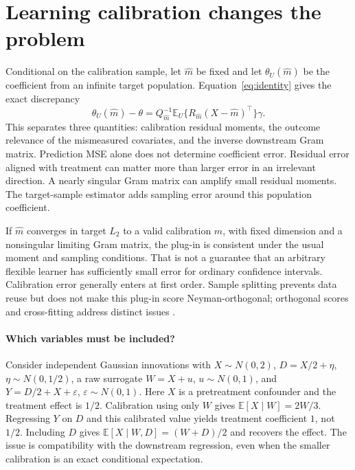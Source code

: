 \documentclass[11pt]{article}
\newcommand{\E}{\mathbb{E}}
\begin{document}
\section{Learning calibration changes the problem}
Conditional on the calibration sample, let $\widehat m$ be fixed and let $\theta_U(\widehat m)$ be the coefficient from an infinite target population. Equation~\eqref{eq:identity} gives the exact discrepancy
\begin{equation}\label{eq:drift}
\theta_U(\widehat m)-\theta
 =Q_{\widehat m}^{-1}\E_U\{R_{\widehat m}(X-\widehat m)^\top\}\gamma.
\end{equation}
This separates three quantities: calibration residual moments, the outcome relevance of the mismeasured covariates, and the inverse downstream Gram matrix. Prediction MSE alone does not determine coefficient error. Residual error aligned with treatment can matter more than larger error in an irrelevant direction. A nearly singular Gram matrix can amplify small residual moments. The target-sample estimator adds sampling error around this population coefficient.

If $\widehat m$ converges in target $L_2$ to a valid calibration $m$, with fixed dimension and a nonsingular limiting Gram matrix, the plug-in is consistent under the usual moment and sampling conditions. That is not a guarantee that an arbitrary flexible learner has sufficiently small error for ordinary confidence intervals. Calibration error generally enters at first order. Sample splitting prevents data reuse but does not make this plug-in score Neyman-orthogonal; orthogonal scores and cross-fitting address distinct issues \citep{chernozhukov2018}.

\paragraph{Which variables must be included?}
Consider independent Gaussian innovations with $X\sim N(0,2)$, $D=X/2+\eta$, $\eta\sim N(0,1/2)$, a raw surrogate $W=X+u$, $u\sim N(0,1)$, and $Y=D/2+X+\varepsilon$, $\varepsilon\sim N(0,1)$. Here $X$ is a pretreatment confounder and the treatment effect is $1/2$. Calibration using only $W$ gives $\E[X\mid W]=2W/3$. Regressing $Y$ on $D$ and this calibrated value yields treatment coefficient $1$, not $1/2$. Including $D$ gives $\E[X\mid W,D]=(W+D)/2$ and recovers the effect. The issue is compatibility with the downstream regression, even when the smaller calibration is an exact conditional expectation.
\end{document}
